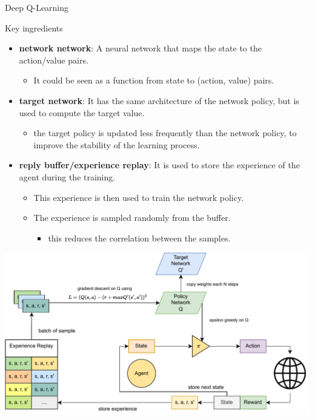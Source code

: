\documentclass[presentation, 8pt]{beamer}\mode<presentation>{\usetheme{AMSBolognaFC}}
\begin{document}
\begin{frame}{Deep Q-Learning}
	\begin{exampleblock}{Key ingredients}
		\begin{itemize}
		\item \textbf{network network}: A neural network that maps the state to the action/value pairs.
		\begin{itemize}
			\item It could be seen as a function from state to (action, value) pairs. 
		\end{itemize}
		\item \textbf{target network}: It has the same architecture of the network policy, but is used to compute the target value.
		\begin{itemize}
			\item the target policy is updated less frequently than the network policy, to improve the stability of the learning process.
		\end{itemize}
		\item \textbf{reply buffer/experience replay}: It is used to store the experience of the agent during the training.
		\begin{itemize}
			\item This experience is then used to train the network policy.
			\item The experience is sampled randomly from the buffer.
			\begin{itemize}
				\item this reduces the correlation between the samples.
			\end{itemize}
		\end{itemize}
	\end{itemize}
	\end{exampleblock}
	\centering
	\includegraphics[width=\textwidth]{img/dqn.pdf}

\end{frame}
\end{document}
